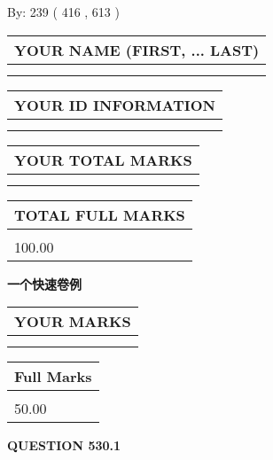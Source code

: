 \documentclass{ctexart}
\begin{document}
   
\hspace{1.0in} By: 
 239 ( 416 ,  613 )
   
   
   
   
\newpage 
\setcounter{page}{ 
   530001 } 
   
   
   
   
\noindent\begin{tabular}{|l|}
\hline
YOUR NAME (FIRST, ... LAST)  \\
\hline
 \\ 
 \\ 
\hline
\end{tabular}
\hspace{0.05in} \begin{tabular}{|l|}
\hline
 YOUR   ID   INFORMATION  \\
\hline
 \\ 
 \\ 
\hline
\end{tabular}
   
   
\vspace{0.2in}\noindent\begin{tabular}{|l|}
\hline
YOUR TOTAL MARKS  \\
\hline
 \\ 
 \\ 
\hline
\end{tabular}
\hspace{0.05in} \begin{tabular}{|l|}
\hline
TOTAL FULL MARKS  \\
\hline
 \\ 
100.00 \\
\hline
\end{tabular}
   
   
 \vspace{0.2in}
{\LARGE {\textbf{ 一个快速卷例}}}
   
   
  
\vspace{0.2in}
  
\noindent\begin{tabular}{|l|}
\hline
 YOUR MARKS  \\
\hline
 \\ 
 \\ 
\hline
\end{tabular}
\hspace{0.05in} \begin{tabular}{|l|}
\hline
 Full Marks  \\
\hline
 \\ 
50.00 \\
\hline
\end{tabular}
{\textbf{\Large{QUESTION
530.1 
}}}
  
\end{document}
